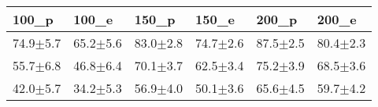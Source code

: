 \begin{tabular}{llllll}
\toprule
100_p & 100_e & 150_p & 150_e & 200_p & 200_e \\
\midrule
74.9$\pm$5.7 & 65.2$\pm$5.6 & 83.0$\pm$2.8 & 74.7$\pm$2.6 & 87.5$\pm$2.5 & 80.4$\pm$2.3 \\
55.7$\pm$6.8 & 46.8$\pm$6.4 & 70.1$\pm$3.7 & 62.5$\pm$3.4 & 75.2$\pm$3.9 & 68.5$\pm$3.6 \\
42.0$\pm$5.7 & 34.2$\pm$5.3 & 56.9$\pm$4.0 & 50.1$\pm$3.6 & 65.6$\pm$4.5 & 59.7$\pm$4.2 \\
\bottomrule
\end{tabular}
